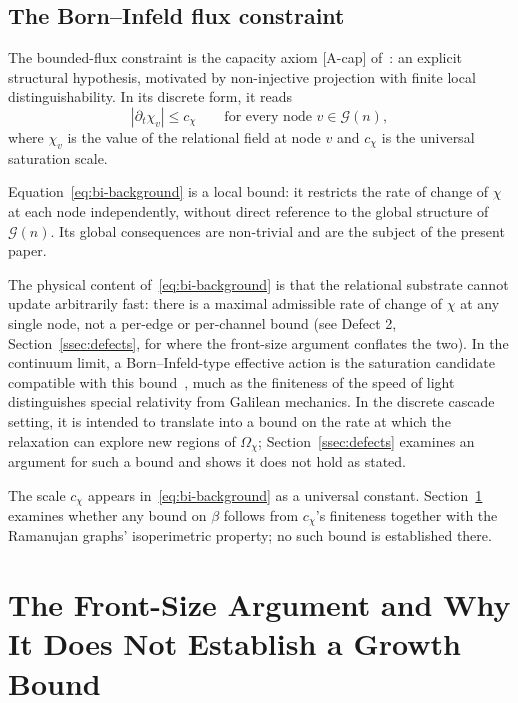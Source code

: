 \documentclass[11pt,a4paper]{article}
\theoremstyle{definition}
\theoremstyle{remark}
\begin{document}
  \subsection{The Born--Infeld flux constraint}
    \label{ssec:bi}

    The bounded-flux constraint is the capacity axiom [A-cap] of~\cite{Beau2026c}:
    an explicit structural hypothesis, motivated by non-injective projection with finite
    local distinguishability.
    In its discrete form, it reads
    \begin{equation}
      \label{eq:bi-background}
      |\partial_t \chi_v| \leq c_\chi
      \qquad \text{for every node } v \in \mathcal{G}(n),
    \end{equation}
    where $\chi_v$ is the value of the relational field at node $v$ and $c_\chi$ is the
    universal saturation scale.

    Equation~\eqref{eq:bi-background} is a local bound: it restricts the rate of change of
    $\chi$ at each node independently, without direct reference to the global structure of
    $\mathcal{G}(n)$.
    Its global consequences are non-trivial and are the subject of the present paper.

    The physical content of~\eqref{eq:bi-background} is that the relational substrate cannot
    update arbitrarily fast: there is a maximal admissible rate of change of $\chi$ at any
    single node, not a per-edge or per-channel bound (see Defect 2, Section~\ref{ssec:defects},
    for where the front-size argument conflates the two).
    In the continuum limit, a Born--Infeld-type effective action is the saturation
    candidate compatible with this bound~\cite{Beau2026c}, much as the finiteness of the
    speed of light distinguishes special relativity from Galilean mechanics.
    In the discrete cascade setting, it is intended to translate into a bound on the rate at
    which the relaxation can explore new regions of $\Omega_\chi$; Section~\ref{ssec:defects}
    examines an argument for such a bound and shows it does not hold as stated.

    The scale $c_\chi$ appears in~\eqref{eq:bi-background} as a universal constant.
    Section~\ref{sec:subdiffusion} examines whether any bound on $\beta$ follows from
    $c_\chi$'s finiteness together with the Ramanujan graphs' isoperimetric property; no such
    bound is established there.

  \section{The Front-Size Argument and Why It Does Not Establish a Growth Bound}
  \label{sec:subdiffusion}
\end{document}
